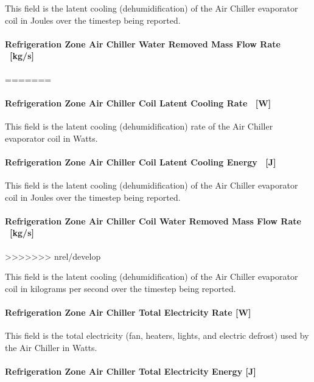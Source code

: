 This field is the latent cooling (dehumidification) of the Air Chiller evaporator coil in Joules over the timestep being reported.

\paragraph{Refrigeration Zone Air Chiller Water Removed Mass Flow Rate ~{[}kg/s{]}}\label{refrigeration-zone-air-chiller-water-removed-mass-flow-rate-kgs-1}
=======
\paragraph{Refrigeration Zone Air Chiller Coil Latent Cooling Rate ~{[}W{]}}\label{refrigeration-zone-air-chiller-coil-latent-cooling-rate-w-1}

This field is the latent cooling (dehumidification) rate of the Air Chiller evaporator coil in Watts.

\paragraph{Refrigeration Zone Air Chiller Coil Latent Cooling Energy ~{[}J{]}}\label{refrigeration-zone-air-chiller-coil-latent-cooling-energy-j}

This field is the latent cooling (dehumidification) of the Air Chiller evaporator coil in Joules over the timestep being reported.

\paragraph{Refrigeration Zone Air Chiller Coil Water Removed Mass Flow Rate ~{[}kg/s{]}}\label{refrigeration-zone-air-chiller-coil-water-removed-mass-flow-rate-kgs-1}
>>>>>>> nrel/develop

This field is the latent cooling (dehumidification) of the Air Chiller evaporator coil in kilograms per second over the timestep being reported.

\paragraph{Refrigeration Zone Air Chiller Total Electricity Rate {[}W{]}}\label{refrigeration-zone-air-chiller-total-electric-power-w}

This field is the total electricity (fan, heaters, lights, and electric defrost) used by the Air Chiller in Watts.

\paragraph{Refrigeration Zone Air Chiller Total Electricity Energy {[}J{]}}\label{refrigeration-zone-air-chiller-total-electric-energy-j}

